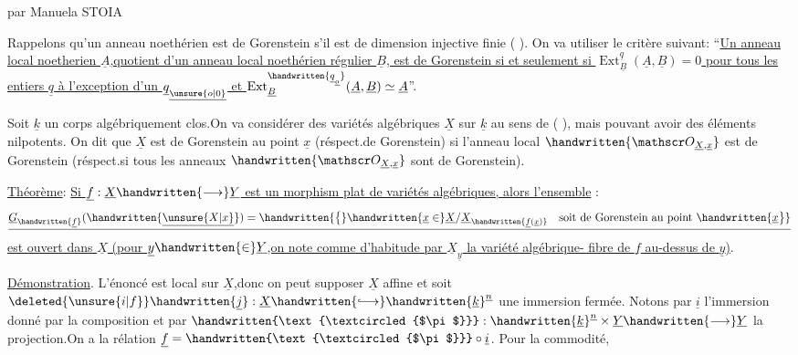 \begin{center}

par Manuela STOIA\end{center}

Rappelons qu'un anneau noethérien est de Gorenstein s'il est de dimension injective finie (  ). On va utiliser
le critère suivant: ``\uline{Un anneau local noetherien $\underline A$,quotient d'un anneau local noethérien régulier $\underline B$, est de Gorenstein
si et seulement si $\operatorname{Ext}^{\underline q}_{\underline B}(\underline A,\underline B)=0$ pour tous les entiers $\underline q$ à
l'exception d'un $\underline q_{\underline{\unsure{o|0}}}$ et $\operatorname{Ext}^{\handwritten{\underline q_{\underline o}}}_{\underline B}(\underline A,\underline B)\simeq\underline A$}''.

Soit $\underline k$ un corps algébriquement clos.On va considérer des variétés algébriques $\underline X$ sur $\underline k$ au sens de (  ), mais pouvant avoir des éléments nilpotents.
On dit que $\underline X$ est de Gorenstein
au point $\underline x$ (réspect.de Gorenstein) si l'anneau
local $\handwritten{\mathscr O_{\underline X,\underline x}}$ est de Gorenstein (réspect.si tous les anneaux $\handwritten{\mathscr O_{\underline X,\underline x}}$ sont de Gorenstein).

\uline{Théorème}: \uline{Si $\underline f:\underline X\handwritten{\longrightarrow}\underline Y$ est un morphism plat de variétés algébriques, alors l'ensemble} :
\[
\underline{\underline G_{\handwritten{\underline f}}(\handwritten{\underline{\unsure{X|x}}})=\handwritten{\bigl\{}\handwritten{\underline x\in}\underline X/\underline X_{\handwritten{\underline f(\underline x)}}\quad\text{soit de Gorenstein au point }\handwritten{\underline x\bigr\}}}
\]
\uline{est ouvert dans $\underline X$ (pour $\underline y\handwritten{\in}\underline Y$,on note comme d'habitude par $\underline X_{\underline y}$
la variété algébrique- fibre de $\underline f$\deleted{\unsure{,}} au-dessus de $\underline y$)}.

\uline{Démonstration}. L'énoncé est local sur $\underline X$,donc on peut
supposer $\underline X$ affine et soit $\deleted{\unsure{i|f}}\handwritten{\underline j}:\underline X\handwritten{\lhook\joinrel\longrightarrow}\handwritten{\underline k}^{\underline n}$ une immersion fermée.
Notons par $\underline i$ l'immersion donné par la composition
et par $\handwritten{\text{\textcircled{$\pi$}}}:\handwritten{\underline k}^{\underline n}\times\underline Y\handwritten{\longrightarrow}\underline Y$ la projection.On a la rélation $\underline f=\handwritten{\text{\textcircled{$\pi$}}}\circ\underline i$. Pour la commodité,
